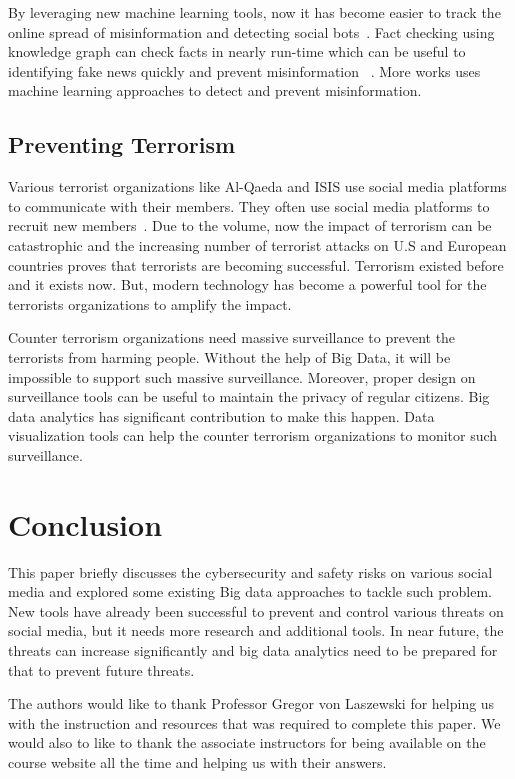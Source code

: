 \documentclass[sigconf]{acmart}
\begin{document}
By leveraging new machine learning tools, now it has become easier to track the online spread of misinformation and detecting social bots~\cite{Shao17hoaxybots,Shao15hoaxy}. Fact checking using knowledge graph can check facts in nearly run-time which can be useful to identifying fake news quickly and prevent misinformation ~\cite{Shiralkar2017Finding-Streams}. More works uses machine learning approaches to detect and prevent misinformation.



\subsection{Preventing Terrorism}
Various terrorist organizations like Al-Qaeda and ISIS use social media platforms to communicate with their members. They often use social media platforms to recruit new members~\cite{terrorism}. Due to the volume, now the impact of terrorism can be catastrophic and the increasing number of terrorist attacks on U.S and European countries proves that terrorists are becoming successful. Terrorism existed before and it exists now. But, modern technology has become a powerful tool for the terrorists organizations to amplify the impact. 

Counter terrorism organizations need massive surveillance to prevent the terrorists from harming people. Without the help of Big Data, it will be impossible to support such massive surveillance. Moreover, proper design on surveillance tools can be useful to maintain the privacy of regular citizens. Big data analytics has significant contribution to make this happen. Data visualization tools can help the counter terrorism organizations to monitor such surveillance.



\section{Conclusion}
This paper briefly discusses the cybersecurity and safety risks on various social media and explored some existing Big data approaches to tackle such problem. New tools have already been successful to prevent and control various threats on social media, but it needs more research and additional tools. In near future, the threats can increase significantly and big data analytics need to be prepared for that to prevent future threats.



\begin{acks}

The authors would like to thank Professor Gregor von Laszewski for helping us with the instruction and resources that was required to complete this paper. We would also to like to thank the associate instructors for being available on the course website all the time and helping us with their answers.

\end{acks}
\end{document}
